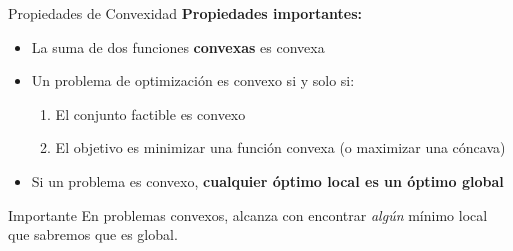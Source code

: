 \documentclass{beamer}
\begin{document}
\begin{frame}{Propiedades de Convexidad}
    \textbf{Propiedades importantes:}
    \begin{itemize}
        \item La suma de dos funciones \textbf{convexas} es convexa
        \item Un problema de optimización es convexo si y solo si:
        \begin{enumerate}
            \item El conjunto factible es convexo
            \item El objetivo es minimizar una función convexa (o maximizar una cóncava)
        \end{enumerate}
        \item Si un problema es convexo, \textbf{cualquier óptimo local es un óptimo global}
    \end{itemize}
    
    \vspace{0.5cm}
    
    \begin{alertblock}{Importante}
        En problemas convexos, alcanza con encontrar \textit{algún} mínimo local que sabremos que es global.
    \end{alertblock}
\end{frame}
\end{document}
